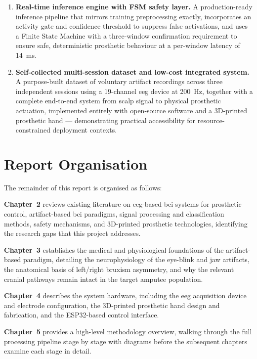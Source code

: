 \begin{enumerate}[leftmargin=*, label=\textbf{C\arabic*.}]
    \item \textbf{Real-time inference engine with FSM safety layer.}
    A production-ready inference pipeline that mirrors training
    preprocessing exactly, incorporates an activity gate and
    confidence threshold to suppress false activations, and uses a
    Finite State Machine with a three-window confirmation requirement
    to ensure safe, deterministic prosthetic behaviour at a per-window
    latency of \SI{14}{\milli\second}.

    \item \textbf{Self-collected multi-session dataset and low-cost
    integrated system.} A purpose-built dataset of voluntary artifact
    recordings across three independent sessions using a 19-channel
    \acrshort{eeg} device at \SI{200}{\hertz}, together with a complete
    end-to-end system from scalp signal to physical prosthetic
    actuation, implemented entirely with open-source software and a
    3D-printed prosthetic hand — demonstrating practical accessibility
    for resource-constrained deployment contexts.

\end{enumerate}

\section{Report Organisation}
\label{sec:organisation}

The remainder of this report is organised as follows:

\textbf{Chapter~2} reviews existing literature on
\acrshort{eeg}-based \acrshort{bci} systems for prosthetic control,
artifact-based \acrshort{bci} paradigms, signal processing and
classification methods, safety mechanisms, and 3D-printed prosthetic
technologies, identifying the research gaps that this project addresses.

\textbf{Chapter~3} establishes the medical and physiological
foundations of the artifact-based paradigm, detailing the
neurophysiology of the eye-blink and jaw artifacts, the anatomical
basis of left/right bruxism asymmetry, and why the relevant cranial
pathways remain intact in the target amputee population.

\textbf{Chapter~4} describes the system hardware, including the
\acrshort{eeg} acquisition device and electrode configuration, the
3D-printed prosthetic hand design and fabrication, and the ESP32-based control interface.

\textbf{Chapter~5} provides a high-level methodology overview,
walking through the full processing pipeline stage by stage with
diagrams before the subsequent chapters examine each stage in detail.

